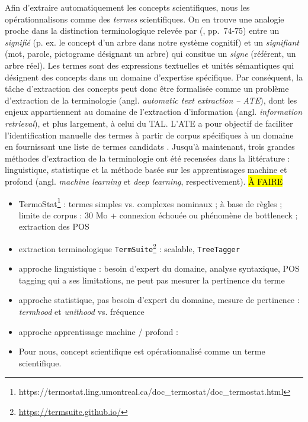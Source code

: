 Afin d'extraire automatiquement les concepts scientifiques, nous les opérationnalisons comme des \textit{termes} scientifiques. On en trouve une analogie proche dans la distinction terminologique relevée par \citeauthor{saussure1915} (\citeyear{saussure1915}, pp.~74-75) entre un \textit{signifié} (p. ex. le concept d'un arbre dans notre système cognitif) et un \textit{signifiant} (mot, parole, pictograme désignant un arbre) qui consitue un \textit{signe} (référent, un arbre réel). Les termes sont des expressions textuelles et unités sémantiques qui désignent des concepts dans un domaine d'expertise spécifique. Par conséquent, la tâche d'extraction des concepts peut donc être formalisée comme un problème d'extraction de la terminologie (angl. \textit{automatic text extraction -- \textsc{ATE}}), dont les enjeux appartiennent au domaine de l'extraction d'information (angl. \textit{information retrieval}), et plus largement, à celui du \textsc{TAL}. L'\textsc{ATE} a pour objectif de faciliter l'identification manuelle des termes à partir de corpus spécifiques à un domaine en fournissant une liste de termes candidats \citep[p.~1]{tran2023recent}. Jusqu'à maintenant, trois grandes méthodes d'extraction de la terminologie ont été recensées dans la littérature : linguistique, statistique et la méthode basée sur les apprentissages machine et profond (angl. \textit{machine learning} et \textit{deep learning}, respectivement).
\hl{À FAIRE}
\begin{itemize}
	\item TermoStat\footnote{https://termostat.ling.umontreal.ca/doc\_termostat/doc\_termostat.html} \citep{drouin2003} : termes simples vs. complexes nominaux ; à base de règles ; limite de corpus : 30 Mo + connexion échouée ou phénomène de bottleneck ; extraction des POS
	\item extraction terminologique \texttt{TermSuite}\footnote{\url{https://termsuite.github.io/}} \citep{cram2016terminology} : scalable, \texttt{TreeTagger}
	\item approche linguistique : besoin d'expert du domaine, analyse syntaxique, POS tagging qui a ses limitations, ne peut pas mesurer la pertinence du terme
	\item approche statistique, pas besoin d'expert du domaine, mesure de pertinence : \textit{termhood} et \textit{unithood} \citep[pp.~6-7]{kageura1996} vs. fréquence
	\item approche apprentissage machine / profond : \citep{tran2023recent}
	\item Pour nous, concept scientifique est opérationnalisé comme un terme scientifique.
\end{itemize}




